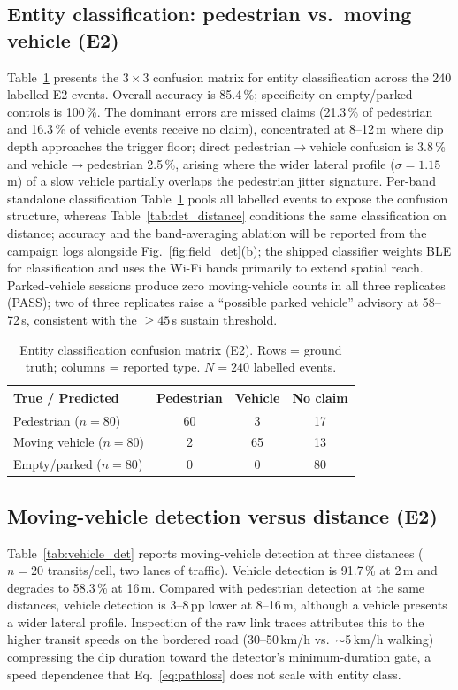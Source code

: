\documentclass[journal,10pt]{IEEEtran}
\begin{document}
\subsection{Entity classification: pedestrian vs.\ moving vehicle (E2)}
Table~\ref{tab:confusion} presents the $3 \times 3$ confusion matrix for
entity classification across the 240 labelled E2 events. Overall accuracy is
85.4\,\%; specificity on empty/parked controls is 100\,\%. The dominant
errors are missed claims (21.3\,\% of pedestrian and 16.3\,\% of vehicle
events receive no claim), concentrated at 8--12\,m where dip depth
approaches the trigger floor; direct pedestrian$\to$vehicle confusion is
3.8\,\% and vehicle$\to$pedestrian 2.5\,\%, arising where the wider lateral
profile ($\sigma = 1.15$\,m) of a slow vehicle partially overlaps the
pedestrian jitter signature. Per-band standalone classification
Table~\ref{tab:confusion} pools all labelled events to expose the confusion
structure, whereas Table~\ref{tab:det_distance} conditions the same
classification on distance; accuracy and the band-averaging ablation will be reported from the campaign
logs alongside Fig.~\ref{fig:field_det}(b); the shipped classifier weights
BLE for classification and uses the Wi-Fi bands primarily to extend spatial reach. Parked-vehicle sessions produce zero
moving-vehicle counts in all three replicates (PASS); two of three replicates
raise a ``possible parked vehicle'' advisory at 58--72\,s, consistent with
the $\geq45$\,s sustain threshold.

\begin{table}[htbp]
\centering
\caption{Entity classification confusion matrix (E2). Rows = ground truth; columns =
reported type. $N = 240$ labelled events.}
\label{tab:confusion}
\footnotesize
\begin{tabular}{@{}lccc@{}}
\toprule
\textbf{True / Predicted} & \textbf{Pedestrian} & \textbf{Vehicle} &
\textbf{No claim} \\
\midrule
Pedestrian  ($n = 80$)  & 60 & 3 & 17 \\
Moving vehicle ($n = 80$) & 2 & 65 & 13 \\
Empty/parked ($n = 80$) & 0 & 0 & 80 \\
\bottomrule
\end{tabular}
\end{table}

\subsection{Moving-vehicle detection versus distance (E2)}
Table~\ref{tab:vehicle_det} reports moving-vehicle detection at three
distances ($n = 20$ transits/cell, two lanes of traffic). Vehicle detection
is 91.7\,\% at 2\,m and degrades to 58.3\,\% at 16\,m. Compared with
pedestrian detection at the same distances, vehicle detection is 3--8\,pp
lower at 8--16\,m, although a vehicle presents a wider lateral profile.
Inspection of the raw link traces attributes this to the higher transit
speeds on the bordered road (30--50\,km/h vs.\ $\sim$5\,km/h walking)
compressing the dip duration toward the detector's minimum-duration gate, a
speed dependence that Eq.~\eqref{eq:pathloss} does not scale with entity
class.
\end{document}
